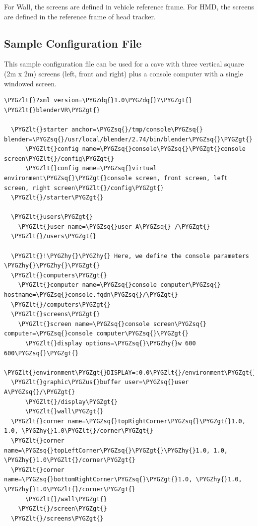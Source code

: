 \documentclass[a4,10pt,openany,oneside]{sphinxmanual}
\def\PYGZus{\char`\_}
\def\PYGZlt{\char`\<}
\def\PYGZgt{\char`\>}
\def\PYGZhy{\char`\-}
\def\PYGZsq{\char`\'}
\def\PYGZdq{\char`\"}
\begin{document}
For Wall, the screens are defined in vehicle reference frame. For HMD, the screens are defined in the reference frame of head tracker.


\subsection{Sample Configuration File}
\label{components/configuration-file:sample-configuration-file}
This sample configuration file can be used for a cave with three vertical square (2m x 2m) screens (left, front and right) plus a console computer with a single windowed screen.

\begin{Verbatim}[commandchars=\\\{\}]
\PYGZlt{}?xml version=\PYGZdq{}1.0\PYGZdq{}?\PYGZgt{}
\PYGZlt{}blenderVR\PYGZgt{}

  \PYGZlt{}starter anchor=\PYGZsq{}/tmp/console\PYGZsq{} blender=\PYGZsq{}/usr/local/blender/2.74/bin/blender\PYGZsq{}\PYGZgt{}
      \PYGZlt{}config name=\PYGZsq{}console\PYGZsq{}\PYGZgt{}console screen\PYGZlt{}/config\PYGZgt{}
      \PYGZlt{}config name=\PYGZsq{}virtual environment\PYGZsq{}\PYGZgt{}console screen, front screen, left screen, right screen\PYGZlt{}/config\PYGZgt{}
  \PYGZlt{}/starter\PYGZgt{}

  \PYGZlt{}users\PYGZgt{}
    \PYGZlt{}user name=\PYGZsq{}user A\PYGZsq{} /\PYGZgt{}
  \PYGZlt{}/users\PYGZgt{}

  \PYGZlt{}!\PYGZhy{}\PYGZhy{} Here, we define the console parameters \PYGZhy{}\PYGZhy{}\PYGZgt{}
  \PYGZlt{}computers\PYGZgt{}
    \PYGZlt{}computer name=\PYGZsq{}console computer\PYGZsq{} hostname=\PYGZsq{}console.fqdn\PYGZsq{}/\PYGZgt{}
  \PYGZlt{}/computers\PYGZgt{}
  \PYGZlt{}screens\PYGZgt{}
    \PYGZlt{}screen name=\PYGZsq{}console screen\PYGZsq{} computer=\PYGZsq{}console computer\PYGZsq{}\PYGZgt{}
      \PYGZlt{}display options=\PYGZsq{}\PYGZhy{}w 600 600\PYGZsq{}\PYGZgt{}
  \PYGZlt{}environment\PYGZgt{}DISPLAY=:0.0\PYGZlt{}/environment\PYGZgt{}
  \PYGZlt{}graphic\PYGZus{}buffer user=\PYGZsq{}user A\PYGZsq{}/\PYGZgt{}
      \PYGZlt{}/display\PYGZgt{}
      \PYGZlt{}wall\PYGZgt{}
  \PYGZlt{}corner name=\PYGZsq{}topRightCorner\PYGZsq{}\PYGZgt{}1.0, 1.0, \PYGZhy{}1.0\PYGZlt{}/corner\PYGZgt{}
  \PYGZlt{}corner name=\PYGZsq{}topLeftCorner\PYGZsq{}\PYGZgt{}\PYGZhy{}1.0, 1.0, \PYGZhy{}1.0\PYGZlt{}/corner\PYGZgt{}
  \PYGZlt{}corner name=\PYGZsq{}bottomRightCorner\PYGZsq{}\PYGZgt{}1.0, \PYGZhy{}1.0, \PYGZhy{}1.0\PYGZlt{}/corner\PYGZgt{}
      \PYGZlt{}/wall\PYGZgt{}
    \PYGZlt{}/screen\PYGZgt{}
  \PYGZlt{}/screens\PYGZgt{}


\end{Verbatim}
\end{document}
